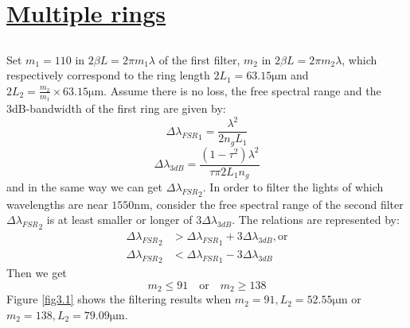 \documentclass[fontsize=11pt]{scrartcl}
\begin{document}
\section{\uline{Multiple rings}}
\subsection{}
Set $m_1=110$ in $2\beta L = 2\pi m_1 \lambda$ of the first filter, 
$m_2$ in $2\beta L = 2\pi m_2 \lambda$,
which respectively correspond to the ring length $2L_1 = 63.15\mathrm{\mu m}$
and $2L_2 = \frac{m_2}{m_1}\times 63.15\mathrm{\mu m}$. 
Assume there is no loss, the free spectral range and the 3dB-bandwidth
of the first ring
are given by:
\begin{equation}
    {\Delta \lambda_{F S R}}_1=\frac{\lambda^{2}}{2 n_{g} L_1}
\end{equation}
\begin{equation}
    \Delta \lambda_{3 d B}=\frac{\left(1-\tau^{2}\right) \lambda^{2}}{\tau  \pi 2 L_1 n_{g}}
\end{equation}
and in the same way we can get ${\Delta \lambda_{F S R}}_2$.
In order to filter the lights of which wavelengths are near $1550 \mathrm{nm}$,
consider the free spectral range of the second filter 
${\Delta \lambda_{F S R}}_2$ is 
at least smaller or longer of $3\Delta \lambda_{3 d B}$.
The relations are represented by:
\begin{equation}
    \begin{aligned}
    {\Delta \lambda_{F S R}}_2&>{\Delta \lambda_{F S R}}_1 + 3\Delta \lambda_{3 d B}, \mathrm{or}\\
    {\Delta \lambda_{F S R}}_2&<{\Delta \lambda_{F S R}}_1 - 3\Delta \lambda_{3 d B}
    \end{aligned}
\end{equation}
Then we get
\begin{equation}
    m_2 \le 91 \quad \mathrm{or} \quad m_2 \ge 138
\end{equation}
Figure \ref{fig3.1} shows the filtering results when $m_2=91, L_2=52.55 \mathrm{\mu m}$ 
or $m_2=138, L_2=79.09 \mathrm{\mu m}$.
\end{document}
